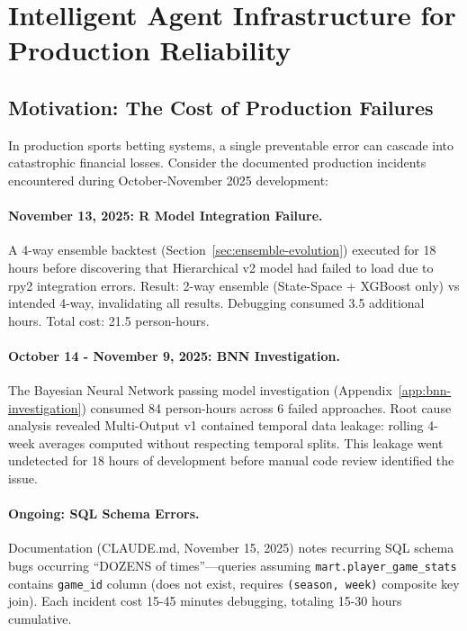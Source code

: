 
\section{Intelligent Agent Infrastructure for Production Reliability}
\label{sec:agent-infrastructure}

\subsection{Motivation: The Cost of Production Failures}

In production sports betting systems, a single preventable error can cascade into catastrophic financial losses. Consider the documented production incidents encountered during October-November 2025 development:

\paragraph{November 13, 2025: R Model Integration Failure.}
A 4-way ensemble backtest (Section~\ref{sec:ensemble-evolution}) executed for 18 hours before discovering that Hierarchical v2 model had failed to load due to rpy2 integration errors. Result: 2-way ensemble (State-Space + XGBoost only) vs intended 4-way, invalidating all results. Debugging consumed 3.5 additional hours. Total cost: 21.5 person-hours.

\paragraph{October 14 - November 9, 2025: BNN Investigation.}
The Bayesian Neural Network passing model investigation (Appendix~\ref{app:bnn-investigation}) consumed 84 person-hours across 6 failed approaches. Root cause analysis revealed Multi-Output v1 contained temporal data leakage: rolling 4-week averages computed without respecting temporal splits. This leakage went undetected for 18 hours of development before manual code review identified the issue.

\paragraph{Ongoing: SQL Schema Errors.}
Documentation (CLAUDE.md, November 15, 2025) notes recurring SQL schema bugs occurring ``DOZENS of times''---queries assuming \texttt{mart.player\_game\_stats} contains \texttt{game\_id} column (does not exist, requires \texttt{(season, week)} composite key join). Each incident cost 15-45 minutes debugging, totaling 15-30 hours cumulative.


